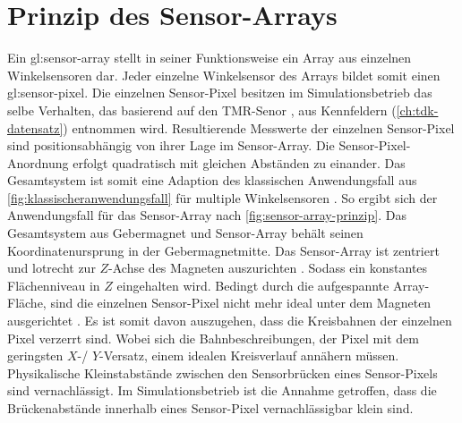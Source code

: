 %

\section{Prinzip des Sensor-Arrays}\label{sec:prinzip-des-sensor-arrays}


Ein \gls{gl:sensor-array} stellt in seiner Funktionsweise ein Array aus einzelnen Winkelsensoren dar. Jeder einzelne Winkelsensor des Arrays bildet somit einen \gls{gl:sensor-pixel}. Die einzelnen Sensor-Pixel besitzen im Simulationsbetrieb das selbe Verhalten, das basierend auf den TMR-Senor \cite{TDK2016}, aus Kennfeldern (\autoref{ch:tdk-datensatz}) entnommen wird. Resultierende Messwerte der einzelnen Sensor-Pixel sind positionsabhängig von ihrer Lage im Sensor-Array\cite{Schuethe2019}. Die Sensor-Pixel-Anordnung erfolgt quadratisch mit gleichen Abständen zu einander. Das Gesamtsystem ist somit eine Adaption des klassischen Anwendungsfall aus \autoref{fig:klassischeranwendungsfall} für multiple Winkelsensoren \cite{Mehm2019}\cite{Schuethe2019}. So ergibt sich der Anwendungsfall für das Sensor-Array nach \autoref{fig:sensor-array-prinzip}.
\newline
Das Gesamtsystem aus Gebermagnet und Sensor-Array behält seinen Koordinatenursprung in der Gebermagnetmitte. Das Sensor-Array ist zentriert und lotrecht zur $Z$-Achse des Magneten auszurichten \cite{Schuethe2019}. Sodass ein konstantes Flächenniveau in $Z$ eingehalten wird. Bedingt durch die aufgespannte Array-Fläche, sind die einzelnen Sensor-Pixel nicht mehr ideal unter dem Magneten ausgerichtet \cite{Schuethe2020b}. Es ist somit davon auszugehen, dass die Kreisbahnen der einzelnen Pixel verzerrt sind. Wobei sich die Bahnbeschreibungen, der Pixel mit dem geringsten $X$-/ $Y$-Versatz, einem idealen Kreisverlauf annähern müssen. Physikalische Kleinstabstände zwischen den Sensorbrücken eines Sensor-Pixels sind vernachlässigt. Im Simulationsbetrieb ist die Annahme getroffen, dass die Brückenabstände innerhalb eines Sensor-Pixel vernachlässigbar klein sind.


\clearpage



